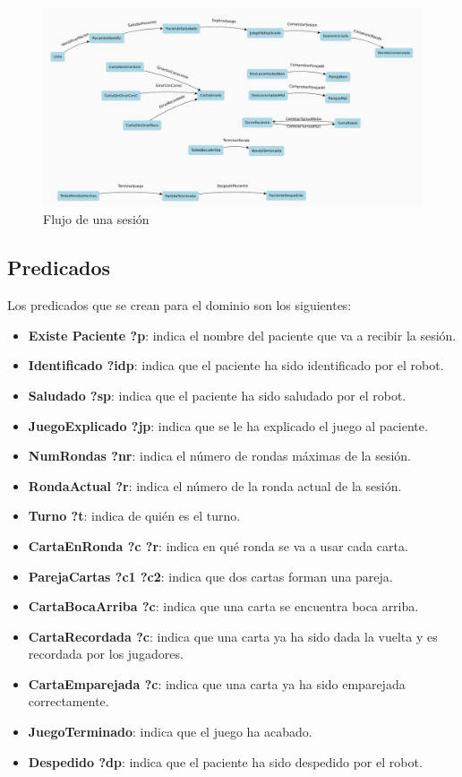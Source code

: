 \documentclass{uc3mpracticas}
\begin{document}
  \begin{figure}[!h]
    \centering
    \includegraphics[width=1.1\linewidth]{./Images/flujo.png}
    \caption*{Flujo de una sesión}
  \end{figure}



  \subsection{Predicados}

  Los predicados que se crean para el dominio son los siguientes:

  \begin{itemize}
    \item \textbf{Existe Paciente ?p}: indica el nombre del paciente que va a recibir la sesión.
    \item \textbf{Identificado ?idp}: indica que el paciente ha sido identificado por el robot.
    \item \textbf{Saludado ?sp}: indica que el paciente ha sido saludado por el robot.
    \item \textbf{JuegoExplicado ?jp}: indica que se le ha explicado el juego al paciente.
    \item \textbf{NumRondas ?nr}: indica el número de rondas máximas de la sesión.
    \item \textbf{RondaActual ?r}: indica el número de la ronda actual de la sesión.
    \item \textbf{Turno ?t}: indica de quién es el turno.
    \item \textbf{CartaEnRonda ?c ?r}: indica en qué ronda se va a usar cada carta.
    \item \textbf{ParejaCartas ?c1 ?c2}: indica que dos cartas forman una pareja.
    \item \textbf{CartaBocaArriba ?c}: indica que una  carta se encuentra boca arriba.
    \item \textbf{CartaRecordada ?c}: indica que una carta ya ha sido dada la vuelta y es recordada por los jugadores.
    \item \textbf{CartaEmparejada ?c}: indica que una carta ya ha sido emparejada correctamente.
    \item \textbf{JuegoTerminado}: indica que el juego ha acabado.
    \item \textbf{Despedido ?dp}: indica que el paciente ha sido despedido por el robot.
  \end{itemize}
\end{document}
